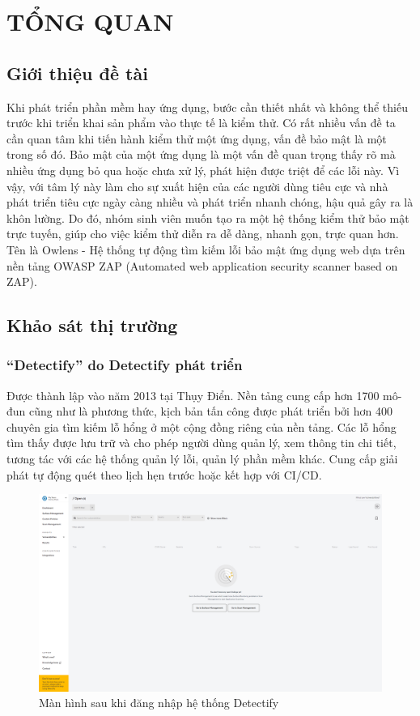 \chapter{TỔNG QUAN}

\section{Giới thiệu đề tài}

\tab Khi phát triển phần mềm hay ứng dụng, bước cần thiết nhất và không thể thiếu trước khi triển khai sản phẩm vào thực tế là kiểm thử.
Có rất nhiều vấn đề ta cần quan tâm khi tiến hành kiểm thử một ứng dụng, vấn đề bảo mật là một trong số đó.
Bảo mật của một ứng dụng là một vấn đề quan trọng thấy rõ mà nhiều ứng dụng bỏ qua hoặc chưa xử lý, phát hiện được triệt để các lỗi này.
Vì vậy, với tâm lý này làm cho sự xuất hiện của các người dùng tiêu cực và nhà phát triển tiêu cực ngày càng nhiều và phát triển nhanh chóng, hậu quả gây ra là khôn lường.
Do đó, nhóm sinh viên muốn tạo ra một hệ thống kiểm thử bảo mật trực tuyến, giúp cho việc kiểm thử diễn ra dễ dàng, nhanh gọn, trực quan hơn.
Tên là Owlens - Hệ thống tự động tìm kiếm lỗi bảo mật ứng dụng web dựa trên nền tảng OWASP ZAP (Automated web application security scanner based on ZAP).

\section{Khảo sát thị trường}

\subsection{“Detectify” do Detectify phát triển}

\tab Được thành lập vào năm 2013 tại Thụy Điển.
Nền tảng cung cấp hơn 1700 mô-đun cũng như là phương thức, kịch bản tấn công được phát triển bởi hơn 400 chuyên gia tìm kiếm lỗ hổng ở một cộng đồng riêng của nền tảng.
Các lỗ hổng tìm thấy được lưu trữ và cho phép người dùng quản lý, xem thông tin chi tiết, tương tác với các hệ thống quản lý lỗi, quản lý phần mềm khác.
Cung cấp giải phát tự động quét theo lịch hẹn trước hoặc kết hợp với CI/CD.

\begin{figure}[H]
    \centering
    \includegraphics[width=\textwidth]{applied-thesis-chapters/chapter-1/detectify.com_app_vulnerabilities.png}
    \caption{Màn hình sau khi đăng nhập hệ thống Detectify}
\end{figure}

